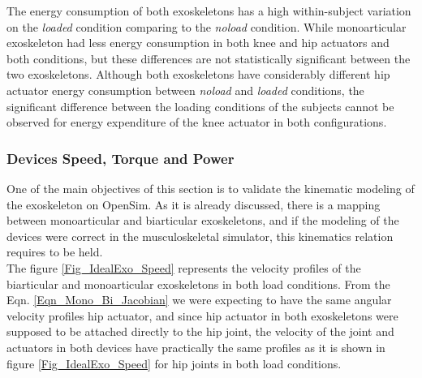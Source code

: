\documentclass[10pt,letterpaper]{article}
\begin{document}
The energy consumption of both exoskeletons has a high within-subject variation on the \textit{loaded} condition comparing to the \textit{noload} condition. While monoarticular exoskeleton had less energy consumption in both knee and hip actuators and both conditions, but these differences are not statistically significant between the two exoskeletons.  Although both exoskeletons have considerably different hip actuator energy consumption between \textit{noload} and \textit{loaded} conditions, the significant difference between the loading conditions of the subjects cannot be observed for energy expenditure of the knee actuator in both configurations.\\
\subsubsection*{Devices Speed, Torque and Power}
One of the main objectives of this section is to validate the kinematic modeling of the exoskeleton on OpenSim. As it is already discussed, there is a mapping between monoarticular and biarticular exoskeletons, and if the modeling of the devices were correct in the musculoskeletal simulator, this kinematics relation requires to be held.\\
The figure \ref{Fig_IdealExo_Speed} represents the velocity profiles of the biarticular and monoarticular exoskeletons in both load conditions. From the Eqn. \eqref{Eqn_Mono_Bi_Jacobian} we were expecting to have the same angular velocity profiles hip actuator, and since hip actuator in both exoskeletons were supposed to be attached directly to the hip joint, the velocity of the joint and actuators in both devices have practically the same profiles as it is shown in figure \ref{Fig_IdealExo_Speed}  for hip joints in both load conditions.\\
\end{document}
